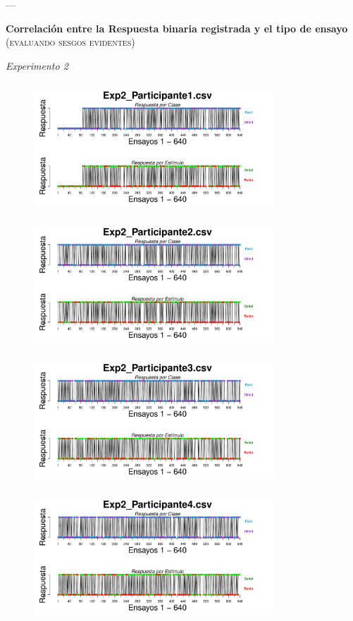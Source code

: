 \documentclass[a4paper ]{article}
\begin{document}
---
\vspace{3mm}
\begin{center}
{\LARGE \textbf{Correlación entre la Respuesta binaria registrada y el tipo de ensayo}}\\
{\small \textsc{(evaluando sesgos evidentes)}}\\
\smallskip
\end{center}
\begin{center}
{\LARGE \textit{Experimento 2}}\\
\end{center}
\vspace{3mm}
\begin{figure}[th]
\centering
\includegraphics[width=9cm, height=5cm]{Figures/BiasResp_Exp2_P1} \includegraphics[width=9cm, height=5cm]{Figures/BiasResp_Exp2_P2} 
\includegraphics[width=9cm, height=5cm]{Figures/BiasResp_Exp2_P3} \includegraphics[width=9cm, height=5cm]{Figures/BiasResp_Exp2_P4} 

\end{figure}
\end{document}
